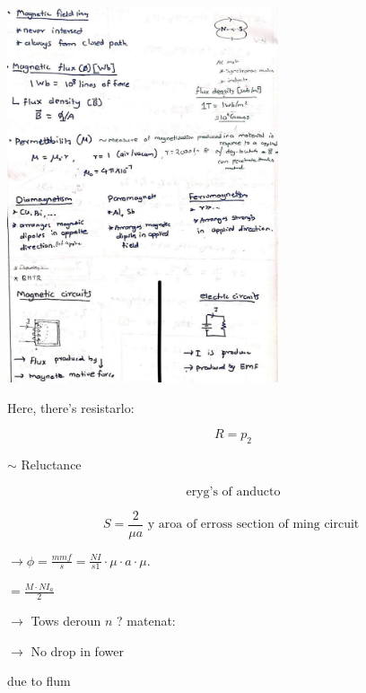 \documentclass[12pt, a4paper]{article}
\newcommand{\figwidth}{8cm}
\begin{document}
\begin{center}
	\includegraphics[max width=\figwidth]{2024_06_15_ae1c13e212c06c234cc4g-03.jpg}
\end{center}

Here, there's resistarlo:

$$
	R=p_{2}
$$

$\sim$ Reluctance

$$
	\text { eryg's of anducto }
$$

$$
	S=\frac{2}{\mu a} \text { y aroa of erross section of ming circuit }
$$

$\rightarrow \phi=\frac{m m f}{s}=\frac{N I}{s 1} \cdot \mu \cdot a \cdot \mu$.

$=\frac{M \cdot N I_{a}}{2}$

$\rightarrow$ Tows deroun $n$ ? matenat:

$\rightarrow$ No drop in fower

due to flum
\end{document}
